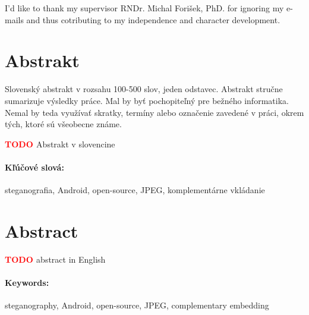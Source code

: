 \documentclass[12pt, oneside]{book}
\def\TODO{\textbf{\textcolor{red}{TODO }}}
\begin{document}
I'd like to thank my supervisor RNDr. Michal Forišek, PhD. 
for ignoring my e-mails and thus cotributing to my independence
and character development.

\vfill


\newpage 
\section*{Abstrakt}


Slovenský abstrakt v rozsahu 100-500 slov, jeden odstavec. Abstrakt
stručne sumarizuje výsledky práce. Mal by byť pochopiteľný pre bežného
informatika. Nemal by teda využívať skratky, termíny alebo označenie
zavedené v práci, okrem tých, ktoré sú všeobecne známe.

\TODO Abstrakt v slovencine

\paragraph*{Kľúčové slová:} steganografia, Android, open-source, JPEG, komplementárne vkládanie 


\newpage 
\section*{Abstract}

\TODO abstract in English

\paragraph*{Keywords:} steganography, Android, open-source, JPEG, complementary embedding



\newpage 

\tableofcontents



\newpage 

\listoffigures

\end{document}
